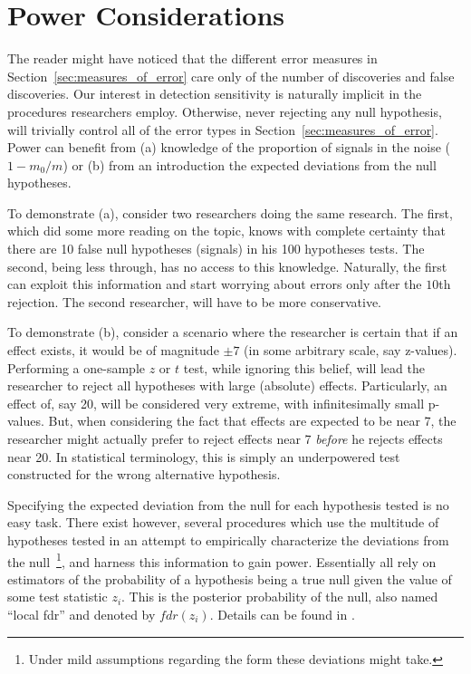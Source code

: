 \documentclass[review,12pt]{article}
\theoremstyle{definition}
\begin{document}
\section{\label{sec:power}Power Considerations}

The reader might have noticed that the different error measures in Section~\ref{sec:measures_of_error} care only of the number of discoveries and false discoveries. Our interest in detection sensitivity is naturally implicit in the procedures researchers employ. Otherwise, never rejecting any null hypothesis, will trivially control all of the error types in Section~\ref{sec:measures_of_error}. 
Power can benefit from (a) knowledge of the proportion of signals in the noise ($ 1 - m_0 / m $) or (b) from an introduction the expected deviations from the null hypotheses. 

To demonstrate (a), consider two researchers doing the same research. The first, which did some more reading on the topic, knows with complete certainty that there are 10 false null hypotheses (signals) in his 100 hypotheses tests. The second, being less through, has no access to this knowledge. Naturally, the first can exploit this information and start worrying about errors only after the $10$th rejection. The second researcher, will have to be more conservative.

To demonstrate (b), consider a scenario where the researcher is certain that if an effect exists, it would be of magnitude $\pm 7$ (in some arbitrary scale, say z-values). Performing a one-sample $z$ or $t$ test, while ignoring this belief, will lead the researcher to reject all hypotheses with large (absolute) effects. Particularly, an effect of, say 20,  will be considered very extreme, with infinitesimally small p-values. But, when considering the fact that effects are expected to be near 7, the researcher might actually prefer to reject effects near 7 \emph{before} he rejects effects near 20. In  statistical terminology, this is simply an underpowered test constructed for the wrong alternative hypothesis. 

Specifying the expected deviation from the null for each hypothesis tested is no easy task. There exist however, several procedures which use the multitude of hypotheses tested in an attempt to empirically characterize the deviations from the null~\footnote{ Under mild assumptions regarding the form these deviations might take.}, and harness this information to gain power. Essentially all rely on estimators of the probability of a hypothesis being a true null given the value of some test statistic $z_i$. This is the posterior probability of the null, also named ``local fdr'' and denoted by $fdr(z_i)$. Details can be found in \cite{efron_microarrays_2008}. 
\end{document}
